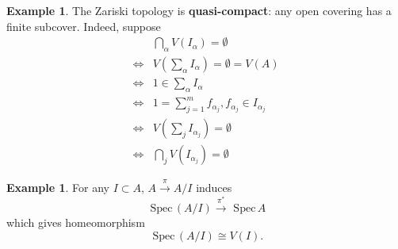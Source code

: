 \documentclass[11pt]{article}
\theoremstyle{definition}
\newtheorem{ex}[thm]{Example}
\newcommand{\spec}{\text{ Spec}\,}
\newcommand{\lrta}{\longrightarrow}
\newcommand{\Llrta}{\Longleftrightarrow}
\begin{document}
\begin{ex}
The Zariski topology is \textbf{quasi-compact}: any open covering has a finite subcover. Indeed, suppose
$$
\begin{aligned}
&\bigcap_\alpha V(I_\alpha)=\emptyset\\
\Llrta & V(\sum_\alpha I_\alpha)=\emptyset=V(A)\\
\Llrta & 1\in \sum_\alpha I_\alpha\\
\Llrta & 1=\sum_{j=1}^{m} f_{\alpha_j}, f_{\alpha_j}\in I_{\alpha_j}\\
\Llrta & V(\sum_j I_{\alpha_j})=\emptyset\\
\Llrta & \bigcap_j V(I_{\alpha_j})=\emptyset
\end{aligned}
$$
\end{ex}
\begin{ex}
For any $I\subset A$, $A\overset{\pi}{\lrta} A/I$ induces 
$$
\spec (A/I)\overset{\pi^*}{\lrta}\spec A
$$
which  gives homeomorphism 
$$
\spec (A/I)\cong V(I).
$$
\end{ex}
\end{document}

